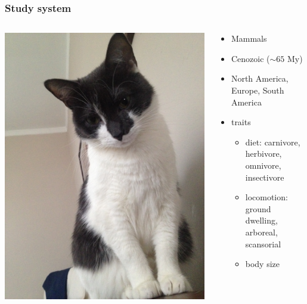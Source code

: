 \documentclass{beamer}
\begin{document}
\begin{frame}
  \frametitle{Study system}
  \begin{columns}
    \begin{column}{0.5\textwidth}
      \begin{center}
        \includegraphics[height = 0.8\textheight, width = \textwidth, keepaspectratio = true]{figure/annyong}
      \end{center}
    \end{column}
    \begin{column}{0.5\textwidth}
      \begin{itemize}
        \item Mammals
        \item Cenozoic (\(\sim 65\) My)
        \item North America, Europe, South America
        \item traits
          \begin{itemize}
            \item diet: carnivore, herbivore, omnivore, insectivore
            \item locomotion: \\ground dwelling, \\arboreal, scansorial
            \item body size
          \end{itemize}
      \end{itemize}
    \end{column}
  \end{columns}
\end{frame}
\end{document}
